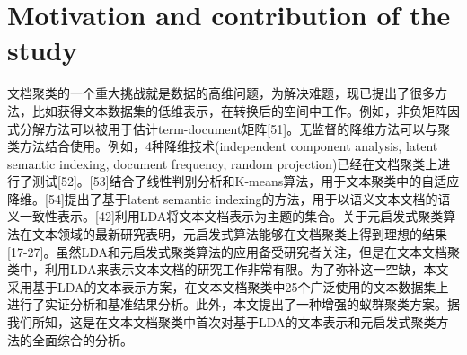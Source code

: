 \documentclass{article}
\begin{document}
\section{Motivation and contribution of the study}
文档聚类的一个重大挑战就是数据的高维问题，为解决难题，现已提出了很多方法，比如获得文本数据集的低维表示，在转换后的空间中工作。例如，非负矩阵因式分解方法可以被用于估计term-document矩阵[51]。无监督的降维方法可以与聚类方法结合使用。例如，4种降维技术(independent component analysis, latent semantic indexing, document frequency, random projection)已经在文档聚类上进行了测试[52]。[53]结合了线性判别分析和K-means算法，用于文本聚类中的自适应降维。[54]提出了基于latent semantic indexing的方法，用于以语义文本文档的语义一致性表示。[42]利用LDA将文本文档表示为主题的集合。关于元启发式聚类算法在文本领域的最新研究表明，元启发式算法能够在文档聚类上得到理想的结果[17-27]。虽然LDA和元启发式聚类算法的应用备受研究者关注，但是在文本文档聚类中，利用LDA来表示文本文档的研究工作非常有限。为了弥补这一空缺，本文采用基于LDA的文本表示方案，在文本文档聚类中25个广泛使用的文本数据集上进行了实证分析和基准结果分析。此外，本文提出了一种增强的蚁群聚类方案。据我们所知，这是在文本文档聚类中首次对基于LDA的文本表示和元启发式聚类方法的全面综合的分析。
\end{document}

